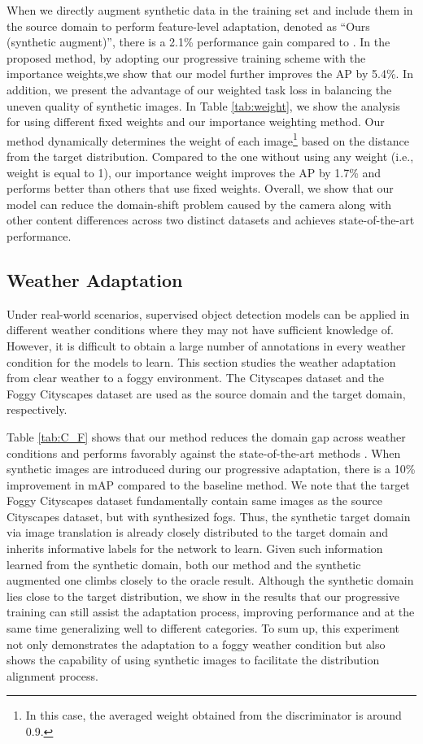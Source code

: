 \documentclass[10pt,twocolumn,letterpaper]{article}
\begin{document}
When we directly augment synthetic data in the training set and include them in the source domain to perform feature-level adaptation, denoted as ``Ours (synthetic augment)'', there is a 2.1\% performance gain compared to \cite{chen2018domain}.
In the proposed method, by adopting our progressive training scheme with the importance weights,we show that our model further improves the AP by 5.4\%.
In addition, we present the advantage of our weighted task loss in balancing the uneven quality of synthetic images.
In Table \ref{tab:weight}, we show the analysis for using different fixed weights and our importance weighting method.
Our method dynamically determines the weight of each image\footnote{In this case, the averaged weight obtained from the discriminator is around 0.9.} based on the distance from the target distribution.
Compared to the one without using any weight (i.e., weight is equal to 1), our importance weight improves the AP by 1.7\% and performs better than others that use fixed weights.
Overall, we show that our model can reduce the domain-shift problem caused by the camera along with other content differences across two distinct datasets and achieves state-of-the-art performance.

\subsection{Weather Adaptation} \label{weather}
Under real-world scenarios, supervised object detection models can be applied in different weather conditions where they may not have sufficient knowledge of.
However, it is difficult to obtain a large number of annotations in every weather condition for the models to learn.
This section studies the weather adaptation from clear weather to a foggy environment.
The Cityscapes dataset \cite{Cordts2016Cityscapes} and the Foggy Cityscapes dataset \cite{SDV18} are used as the source domain and the target domain, respectively.


Table \ref{tab:C_F} shows that our method reduces the domain gap across weather conditions and performs favorably against the state-of-the-art methods \cite{chen2018domain,Saito_2019_CVPR,Zhu_2019_CVPR,kim2019diversify}.
When synthetic images are introduced during our progressive adaptation, there is a 10\% improvement in mAP compared to the baseline method.
We note that the target Foggy Cityscapes dataset fundamentally contain same images as the source Cityscapes dataset, but with synthesized fogs.
Thus, the synthetic target domain  via image translation is already closely distributed to the target domain and inherits informative labels for the network to learn.
Given such information learned from the synthetic domain, both our method and the synthetic augmented one climbs closely to the oracle result.
Although the synthetic domain lies close to the target distribution, we show in the results that our progressive training can still assist the adaptation process, improving performance and at the same time generalizing well to different categories.
To sum up, this experiment not only demonstrates the adaptation to a foggy weather condition but also shows the capability of using synthetic images to facilitate the distribution alignment process.
\end{document}
